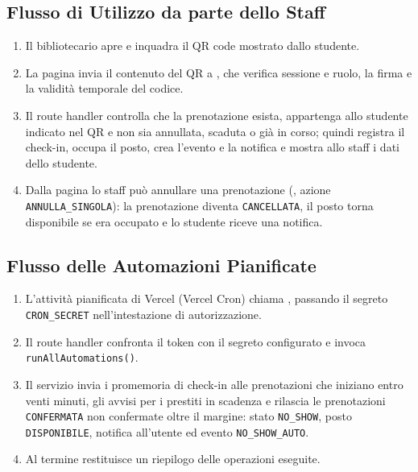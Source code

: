 \documentclass[11pt,a4paper,oneside,openany]{book}
\begin{document}
\subsection{Flusso di Utilizzo da parte dello Staff}

\begin{enumerate}
  \item Il bibliotecario apre  e inquadra il QR code
        mostrato dallo studente.
  \item La pagina invia il contenuto del QR a
        , che verifica sessione e ruolo,
        la firma e la validità temporale del codice.
  \item Il route handler controlla che la prenotazione esista, appartenga allo
        studente indicato nel QR e non sia annullata, scaduta o già in corso;
        quindi registra il check-in, occupa il posto, crea l'evento e la
        notifica e mostra allo staff i dati dello studente.
  \item Dalla pagina  lo staff può annullare una
        prenotazione (, azione
        \texttt{ANNULLA\_SINGOLA}): la prenotazione diventa
        \texttt{CANCELLATA}, il posto torna disponibile se era occupato e lo
        studente riceve una notifica.
\end{enumerate}


\subsection{Flusso delle Automazioni Pianificate}

\begin{enumerate}
  \item L'attività pianificata di Vercel (Vercel Cron) chiama
        , passando il segreto
        \texttt{CRON\_SECRET} nell'intestazione di autorizzazione.
  \item Il route handler confronta il token con il segreto configurato e
        invoca \texttt{runAllAutomations()}.
  \item Il servizio invia i promemoria di check-in alle prenotazioni che
        iniziano entro venti minuti, gli avvisi per i prestiti in scadenza e
        rilascia le prenotazioni \texttt{CONFERMATA} non confermate oltre il
        margine: stato \texttt{NO\_SHOW}, posto \texttt{DISPONIBILE}, notifica
        all'utente ed evento \texttt{NO\_SHOW\_AUTO}.
  \item Al termine restituisce un riepilogo delle operazioni eseguite.
\end{enumerate}

\end{document}
